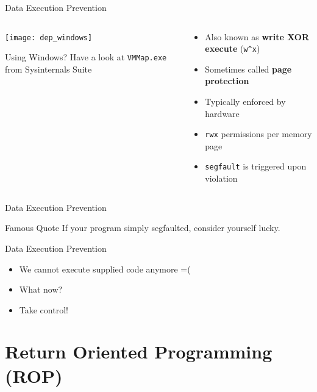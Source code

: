 \documentclass[beamer]{uibk}
\begin{document}
\begin{frame}{Data Execution Prevention}
    \begin{columns}
        \begin{column}{0.5\textwidth}
            \begin{center}
                \texttt{[image: dep\_windows]}
            \end{center}
            \medskip

            Using Windows? Have a look at \texttt{VMMap.exe} from Sysinternals Suite
        \end{column}
        \begin{column}{0.5\textwidth}
            \begin{itemize}
                \item Also known as \textbf{write XOR execute} (\texttt{w\^{}x})
                \medskip
                \item Sometimes called \textbf{page protection}
                \bigskip
                \item Typically enforced by hardware
                \medskip
                \item \texttt{rwx} permissions per memory page
                \medskip
                \item \texttt{segfault} is triggered upon violation
            \end{itemize}
        \end{column}
    \end{columns}
\end{frame}

\begin{frame}{Data Execution Prevention}
    \begin{block}{Famous Quote}
        If your program simply segfaulted, consider yourself lucky.
    \end{block}
\end{frame}

\begin{frame}{Data Execution Prevention}
    \begin{itemize}
        \item We cannot execute supplied code anymore =(
        \item What now?
        \bigskip
        \pause
        \item Take control!
    \end{itemize}
\end{frame}

\section{Return Oriented Programming (ROP)}
\end{document}
